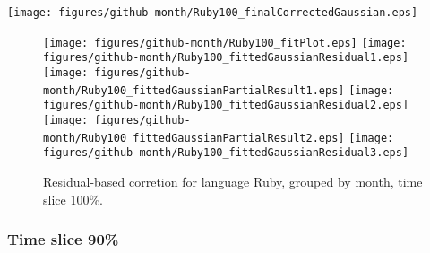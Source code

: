 \begin{center}
{\texttt{[image: figures/github-month/Ruby100\_finalCorrectedGaussian.eps]}}
\end{center}

\FloatBarrier

\begin{figure}[t]
\centering
{}
{\texttt{[image: figures/github-month/Ruby100\_fitPlot.eps]}}
{\texttt{[image: figures/github-month/Ruby100\_fittedGaussianResidual1.eps]}}
{\texttt{[image: figures/github-month/Ruby100\_fittedGaussianPartialResult1.eps]}}
{\texttt{[image: figures/github-month/Ruby100\_fittedGaussianResidual2.eps]}}
{\texttt{[image: figures/github-month/Ruby100\_fittedGaussianPartialResult2.eps]}}
{\texttt{[image: figures/github-month/Ruby100\_fittedGaussianResidual3.eps]}}
\caption{Residual-based corretion for language Ruby, grouped by month, time slice 100\%.}
\end{figure}


\FloatBarrier


\subsubsection{Time slice 90\%}


